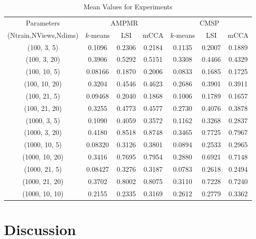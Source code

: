 \documentclass{article} %
\begin{document}
\begin{table}
\caption{\label{tb:mean} Mean Values for Experiments}
\begin{center}
\begin{tabular}{|c|c|c|c|c|c|c|}
\hline
Parameters&\multicolumn{3}{|c|}{AMPMR} &  \multicolumn{3}{|c|}{CMSP}\\
\cline{2-7}
(Ntrain,NViews,Ndims)& $k$-means & LSI & mCCA &$k$-means & LSI & mCCA \\
\hline
\hline
(100,   3,    5) & 0.1096 & 0.2306 &0.2184& 0.1135& 0.2007 &0.1889 \\
\hline
(100,   3,   20) & 0.3906 & 0.5292 &0.5151& 0.3308& 0.4466 &0.4329 \\
\hline
(100,   10,   5) & 0.08166& 0.1870 &0.2006& 0.0833& 0.1685 &0.1725\\
\hline
(100,   10,  20) & 0.3204 & 0.4546 &0.4623& 0.2686& 0.3901 &0.3911\\
\hline
(100,   21,   5) & 0.09468& 0.2040 &0.1868& 0.1006& 0.1789 &0.1657\\
\hline
(100,  21,  20) & 0.3255 & 0.4773 &0.4577& 0.2730& 0.4076 &0.3878\\
\hline
(1000,  3,    5) & 0.1090 & 0.4059 &0.3572& 0.1162& 0.3268 &0.2837\\
\hline
(1000,  3,   20) & 0.4180 & 0.8518 &0.8748& 0.3465& 0.7725 &0.7967\\
\hline
(1000,  10,   5) & 0.08320& 0.3126 &0.3801& 0.0894& 0.2533 &0.2965\\
\hline
(1000,  10,  20) & 0.3416 & 0.7695 &0.7954& 0.2880& 0.6921 &0.7148\\
\hline
(1000,  21,   5) & 0.08427& 0.3276 &0.3187& 0.0783& 0.2618 &0.2494\\
\hline
(1000,  21,  20) & 0.3702 & 0.8002 &0.8075& 0.3110& 0.7228 &0.7240\\
\hline
\hline
(1000, 10, 10) &0.2155 & 0.2335 & 0.3169& 0.2612 & 0.2779 & 0.3362\\
\hline
\end{tabular}
\end{center}
\end{table}



\section{Discussion}
\end{document}
